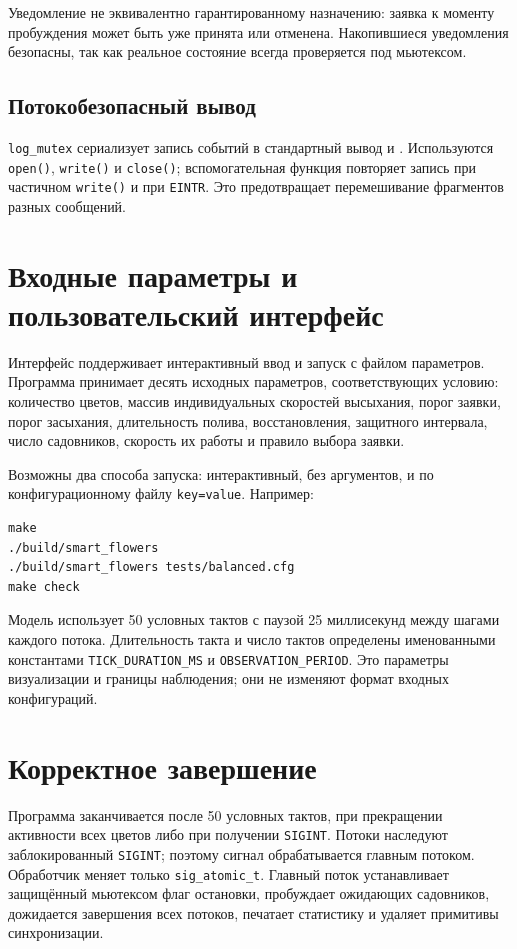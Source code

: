 \documentclass[12pt,a4paper]{article}
\begin{document}
Уведомление не эквивалентно гарантированному назначению: заявка к
моменту пробуждения может быть уже принята или отменена. Накопившиеся
уведомления безопасны, так как реальное состояние всегда проверяется
под мьютексом.

\subsection{Потокобезопасный вывод}

\texttt{log\_mutex} сериализует запись событий в стандартный вывод и
. Используются \texttt{open()}, \texttt{write()} и
\texttt{close()}; вспомогательная функция повторяет запись при частичном
\texttt{write()} и при \texttt{EINTR}. Это предотвращает перемешивание
фрагментов разных сообщений.

\section{Входные параметры и пользовательский интерфейс}

Интерфейс поддерживает интерактивный ввод и запуск с файлом параметров. Программа принимает десять
исходных параметров, соответствующих условию: количество цветов,
массив индивидуальных скоростей высыхания, порог заявки, порог
засыхания, длительность полива, восстановления, защитного интервала,
число садовников, скорость их работы и правило выбора заявки.

Возможны два способа запуска: интерактивный, без аргументов, и по
конфигурационному файлу \texttt{key=value}. Например:
\begin{lstlisting}
make
./build/smart_flowers
./build/smart_flowers tests/balanced.cfg
make check
\end{lstlisting}

Модель использует 50 условных тактов с паузой 25 миллисекунд между
шагами каждого потока. Длительность такта и число тактов определены
именованными константами \texttt{TICK\_DURATION\_MS} и
\texttt{OBSERVATION\_PERIOD}. Это параметры визуализации и границы
наблюдения; они не изменяют формат входных конфигураций.

\section{Корректное завершение}

Программа заканчивается после 50 условных тактов, при прекращении
активности всех цветов либо при получении \texttt{SIGINT}. Потоки
наследуют заблокированный \texttt{SIGINT}; поэтому сигнал обрабатывается
главным потоком. Обработчик меняет только \texttt{sig\_atomic\_t}.
Главный поток устанавливает защищённый мьютексом флаг остановки,
пробуждает ожидающих садовников, дожидается завершения всех потоков,
печатает статистику и удаляет примитивы синхронизации.
\end{document}

